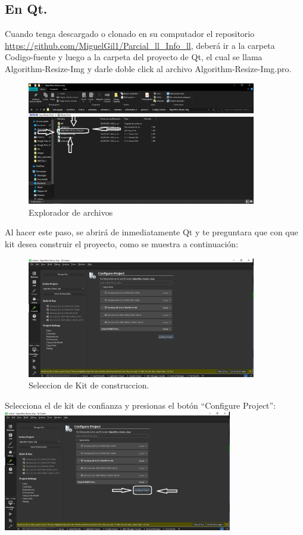 \documentclass{article}
\begin{document}
\subsection{En Qt.}
Cuando tenga descargado o clonado en su computador el repositorio \url{https://github.com/MiguelGil1/Parcial_ll_Info_ll}, deberá ir a la carpeta Codigo-fuente y luego a la carpeta del proyecto de Qt, el cual se llama Algorithm-Resize-Img y darle doble click al archivo Algorithm-Resize-Img.pro.
\begin{figure}[h]
  \includegraphics[width=10cm]{explorador_archivos.PNG}
  \centering
  \caption{Explorador de archivos}
  \label{fig:explorador_archivos}
\end{figure}
Al hacer este paso, se abrirá de inmediatamente Qt y te preguntara que con que kit desea construir el proyecto, como se muestra a continuación:
\begin{figure}[h]
  \includegraphics[width=10cm]{build.PNG}
  \centering
  \caption{Seleccion de Kit de construccion.}
  \label{fig:build}
\end{figure}
Selecciona el de kit de confianza y presionas el botón “Configure Project”:
\\
\includegraphics[width=10cm]{configurar_proyecto.PNG}
\end{document}
